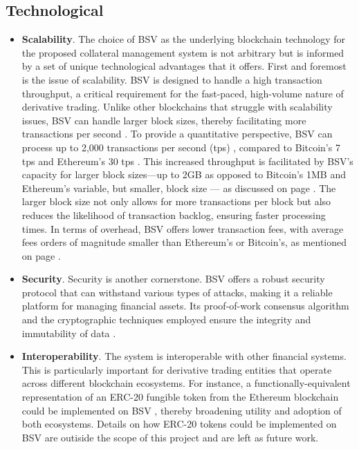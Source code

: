 \subsection{Technological}
\label{subsec:benefits_technological}

\begin{itemize}
    \item \textbf{Scalability}. The choice of BSV as the underlying blockchain technology for the proposed collateral management system is not arbitrary but is informed by a set of unique technological advantages that it offers. First and foremost is the issue of scalability. BSV is designed to handle a high transaction throughput, a critical requirement for the fast-paced, high-volume nature of derivative trading. Unlike other blockchains that struggle with scalability issues, BSV can handle larger block sizes, thereby facilitating more transactions per second \citep{zohar2015bitcoin}. To provide a quantitative perspective, BSV can process up to 2,000 transactions per second (tps) \citep{tartan2021scalable}, compared to Bitcoin's 7 tps \citep{gobel2017increased} and Ethereum's 30 tps \citep{li2020comparative}. This increased throughput is facilitated by BSV's capacity for larger block sizes—up to 2GB as opposed to Bitcoin's 1MB and Ethereum's variable, but smaller, block size --- as discussed on page \pageref{item:scalability}. The larger block size not only allows for more transactions per block but also reduces the likelihood of transaction backlog, ensuring faster processing times. In terms of overhead, BSV offers lower transaction fees, with average fees orders of magnitude smaller than Ethereum's or Bitcoin's, as mentioned on page \pageref{item:smart_contracts}.

    \item \textbf{Security}. Security is another cornerstone. BSV offers a robust security protocol that can withstand various types of attacks, making it a reliable platform for managing financial assets. Its proof-of-work consensus algorithm and the cryptographic techniques employed ensure the integrity and immutability of data \citep{nakamoto2008bitcoin}.

    \item \textbf{Interoperability}. The system is interoperable with other financial systems. This is particularly important for derivative trading entities that operate across different blockchain ecosystems. For instance, a functionally-equivalent representation of an ERC-20 fungible token from the Ethereum blockchain \citep{erc_20_eth} could be implemented on BSV \citep{erc_20_bsv}, thereby broadening utility and adoption of both ecosystems. Details on how ERC-20 tokens could be implemented on BSV are outiside the scope of this project and are left as future work.

\end{itemize}